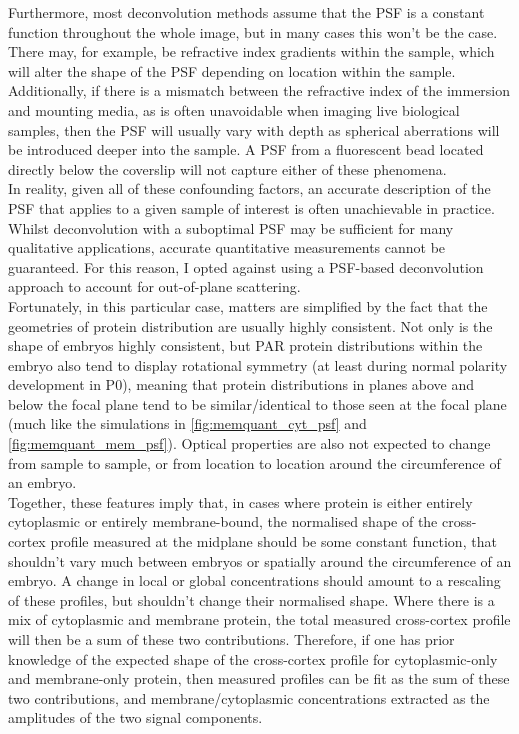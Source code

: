 \documentclass[12pt]{"article"}
\begin{document}
Furthermore, most deconvolution methods assume that the PSF is a constant function throughout the whole image, but in many cases this won't be the case. There may, for example, be refractive index gradients within the sample, which will alter the shape of the PSF depending on location within the sample. Additionally, if there is a mismatch between the refractive index of the immersion and mounting media, as is often unavoidable when imaging live biological samples, then the PSF will usually vary with depth as spherical aberrations will be introduced deeper into the sample. A PSF from a fluorescent bead located directly below the coverslip will not capture either of these phenomena.\\

In reality, given all of these confounding factors, an accurate description of the PSF that applies to a given sample of interest is often unachievable in practice. Whilst deconvolution with a suboptimal PSF may be sufficient for many qualitative applications, accurate quantitative measurements cannot be guaranteed. For this reason, I opted against using a PSF-based deconvolution approach to account for out-of-plane scattering.\\

Fortunately, in this particular case, matters are simplified by the fact that the geometries of protein distribution are usually highly consistent. Not only is the shape of embryos highly consistent, but PAR protein distributions within the embryo also tend to display rotational symmetry (at least during normal polarity development in P0), meaning that protein distributions in planes above and below the focal plane tend to be similar/identical to those seen at the focal plane (much like the simulations in \cref{fig:memquant_cyt_psf} and \cref{fig:memquant_mem_psf}). Optical properties are also not expected to change from sample to sample, or from location to location around the circumference of an embryo.\\

Together, these features imply that, in cases where protein is either entirely cytoplasmic or entirely membrane-bound, the normalised shape of the cross-cortex profile measured at the midplane should be some constant function, that shouldn't vary much between embryos or spatially around the circumference of an embryo. A change in local or global concentrations should amount to a rescaling of these profiles, but shouldn't change their normalised shape. Where there is a mix of cytoplasmic and membrane protein, the total measured cross-cortex profile will then be a sum of these two contributions. Therefore, if one has prior knowledge of the expected shape of the cross-cortex profile for cytoplasmic-only and membrane-only protein, then measured profiles can be fit as the sum of these two contributions, and membrane/cytoplasmic concentrations extracted as the amplitudes of the two signal components.\\
\end{document}
